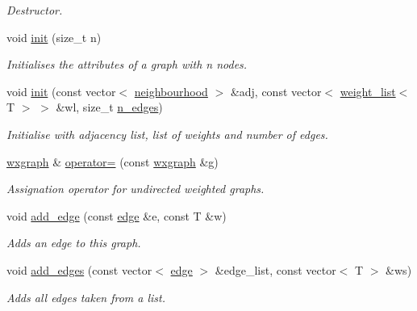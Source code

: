 \begin{DoxyCompactItemize}
\begin{DoxyCompactList}\small\item\em Destructor. \end{DoxyCompactList}\item 
void \hyperlink{classlgraph_1_1utils_1_1wxgraph_a566ae9fe69209230ef159ed350ab8f7f}{init} (size\-\_\-t n)
\begin{DoxyCompactList}\small\item\em Initialises the attributes of a graph with {\itshape n} nodes. \end{DoxyCompactList}\item 
void \hyperlink{classlgraph_1_1utils_1_1wxgraph_a061c179dd8091ba050fa445cbc94218c}{init} (const vector$<$ \hyperlink{namespacelgraph_1_1utils_a0f2ef47028a466d26841709e705390ac}{neighbourhood} $>$ \&adj, const vector$<$ \hyperlink{namespacelgraph_1_1utils_a11e7963f3637ea13778b8d3e69d2c17f}{weight\-\_\-list}$<$ T $>$ $>$ \&wl, size\-\_\-t \hyperlink{classlgraph_1_1utils_1_1xxgraph_af3f7c3835406c2cbf70479ae1c0253c9}{n\-\_\-edges})
\begin{DoxyCompactList}\small\item\em Initialise with adjacency list, list of weights and number of edges. \end{DoxyCompactList}\item 
\hyperlink{classlgraph_1_1utils_1_1wxgraph}{wxgraph} \& \hyperlink{classlgraph_1_1utils_1_1wxgraph_a09fdb762864b9c663f8e2acf835e5191}{operator=} (const \hyperlink{classlgraph_1_1utils_1_1wxgraph}{wxgraph} \&g)
\begin{DoxyCompactList}\small\item\em Assignation operator for undirected weighted graphs. \end{DoxyCompactList}\item 
void \hyperlink{classlgraph_1_1utils_1_1wxgraph_adc945f23e3008ee9ef3f65dc5656e953}{add\-\_\-edge} (const \hyperlink{namespacelgraph_1_1utils_a6510284ce1b1ae5dc97ce5d2de426e10}{edge} \&e, const T \&w)
\begin{DoxyCompactList}\small\item\em Adds an edge to this graph. \end{DoxyCompactList}\item 
void \hyperlink{classlgraph_1_1utils_1_1wxgraph_a972a2483966f4b1d485c5d14157ee9be}{add\-\_\-edges} (const vector$<$ \hyperlink{namespacelgraph_1_1utils_a6510284ce1b1ae5dc97ce5d2de426e10}{edge} $>$ \&edge\-\_\-list, const vector$<$ T $>$ \&ws)
\begin{DoxyCompactList}\small\item\em Adds all edges taken from a list. \end{DoxyCompactList}\item 

\end{DoxyCompactItemize}
